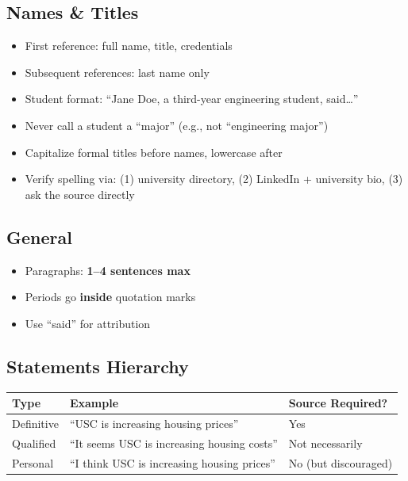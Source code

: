 \documentclass[12pt]{article}
\newlength{\tblwidth}
\begin{document}
\subsection{Names \& Titles}
\begin{itemize}
    \item First reference: full name, title, credentials
    \item Subsequent references: last name only
    \item Student format: ``Jane Doe, a third-year engineering student, said\ldots''
    \item Never call a student a ``major'' (e.g., not ``engineering major'')
    \item Capitalize formal titles before names, lowercase after
    \item Verify spelling via: (1) university directory, (2) LinkedIn + university bio, (3) ask the source directly
\end{itemize}

\subsection{General}
\begin{itemize}
    \item Paragraphs: \textbf{1--4 sentences max}
    \item Periods go \textbf{inside} quotation marks
    \item Use ``said'' for attribution
\end{itemize}

\subsection{Statements Hierarchy}

\begin{longtable}{p{0.18\tblwidth} p{0.46\tblwidth} p{0.32\tblwidth}}
\toprule
\textbf{Type} & \textbf{Example} & \textbf{Source Required?} \\
\midrule
Definitive & ``USC is increasing housing prices'' & Yes \\
Qualified & ``It seems USC is increasing housing costs'' & Not necessarily \\
Personal & ``I think USC is increasing housing prices'' & No (but discouraged) \\
\bottomrule
\end{longtable}
\end{document}
